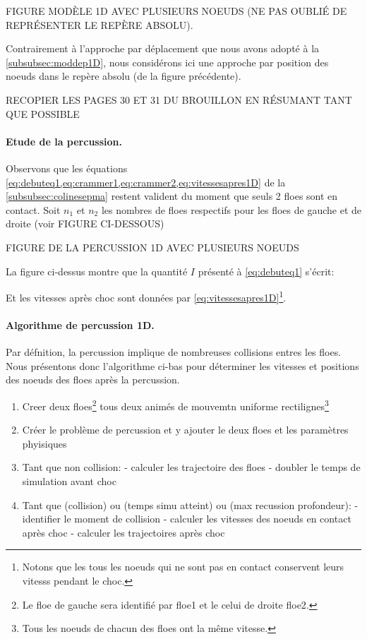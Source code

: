 FIGURE MODÈLE 1D AVEC PLUSIEURS NOEUDS (NE PAS OUBLIÉ DE REPRÉSENTER LE REPÈRE ABSOLU).

Contrairement à l'approche par déplacement que nous avons adopté à la \cref{subsubsec:moddep1D}, nous considérons ici une approche par position des noeuds dans le repère absolu (de la figure précédente).  

RECOPIER LES PAGES 30 ET 31 DU BROUILLON EN RÉSUMANT TANT QUE POSSIBLE



\paragraph{Etude de la percussion.} Observons que les équations \cref{eq:debuteq1,eq:crammer1,eq:crammer2,eq:vitessesapres1D} de la \cref{subsubsec:colinesepma} restent valident du moment que seuls 2 floes sont en contact. Soit $n_1$ et $n_2$ les nombres de floes respectifs pour les floes de gauche et de droite (voir FIGURE CI-DESSOUS)

FIGURE DE LA PERCUSSION 1D AVEC PLUSIEURS NOEUDS 


La figure ci-dessus montre que la quantité $I$ présenté à \cref{eq:debuteq1} s'écrit:

\noindent Et les vitesses après choc sont données par \cref{eq:vitessesapres1D}\footnote{Notons que les tous les noeuds qui ne sont pas en contact conservent leurs vitesss pendant le choc.}.


\paragraph{Algorithme de percussion 1D.} Par défnition, la percussion implique de nombreuses collisions entres les floes. Nous présentons donc l'algorithme ci-bas pour déterminer les vitesses et positions des noeuds des floes après la percussion.
\begin{enumerate}
    \item Creer deux floes\footnote{Le floe de gauche sera identifié par floe1 et le celui de droite floe2.} tous deux animés de mouvemtn uniforme rectilignes\footnote{Tous les noeuds de chacun des floes ont la même vitesse.}
    \item Créer le problème de percussion et y ajouter le deux floes et les paramètres phyisiques
    \item Tant que non collision: - calculer les trajectoire des floes - doubler le temps de simulation avant choc
    \item Tant que (collision) ou (temps simu atteint) ou (max recussion profondeur): - identifier le moment de collision - calculer les vitesses des noeuds en contact après choc - calculer les trajectoires après choc 
\end{enumerate}



